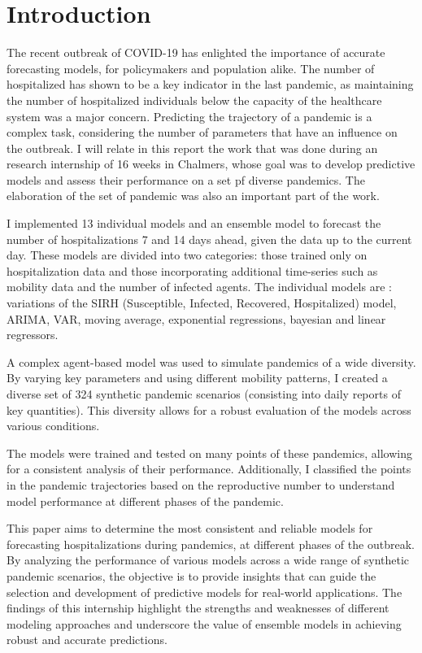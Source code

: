 \section{Introduction}

The recent outbreak of COVID-19 has enlighted the importance of accurate forecasting models, for policymakers and population alike. 
The number of hospitalized has shown to be a key indicator in the last pandemic, as maintaining the number of hospitalized individuals below the capacity of the healthcare system was a major concern.
Predicting the trajectory of a pandemic is a complex task, considering the number of parameters that have an influence on the outbreak. 
I will relate in this report the work that was done during an research internship of 16 weeks in Chalmers, whose goal was to develop predictive models and assess their performance on a set pf diverse pandemics. 
The elaboration of the set of pandemic was also an important part of the work. 

I implemented 13 individual models and an ensemble model to forecast the number of hospitalizations 7 and 14 days ahead, given the data up to the current day.
These models are divided into two categories: those trained only on hospitalization data and those incorporating additional time-series such as mobility data and the number of infected agents. 
The individual models are : variations of the SIRH (Susceptible, Infected, Recovered, Hospitalized) model, ARIMA, VAR, moving average, exponential regressions, bayesian and linear regressors.

A complex agent-based model was used to simulate pandemics of a wide diversity. 
By varying key parameters and using different mobility patterns, I created a diverse set of 324 synthetic pandemic scenarios (consisting into daily reports of key quantities). 
This diversity allows for a robust evaluation of the models across various conditions.

The models were trained and tested on many points of these pandemics, allowing for a consistent analysis of their performance. 
Additionally, I classified the points in the pandemic trajectories based on the reproductive number to understand model performance at different phases of the pandemic.

This paper aims to determine the most consistent and reliable models for forecasting hospitalizations during pandemics, at different phases of the outbreak. 
By analyzing the performance of various models across a wide range of synthetic pandemic scenarios, the objective is to provide insights that can guide the selection and development of predictive models for real-world applications. 
The findings of this internship highlight the strengths and weaknesses of different modeling approaches and underscore the value of ensemble models in achieving robust and accurate predictions.

